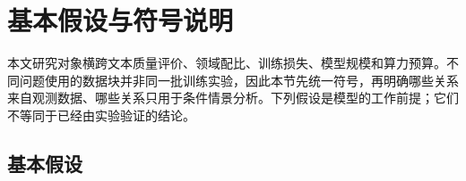 \section{基本假设与符号说明}
\label{sec:assumptions}

本文研究对象横跨文本质量评价、领域配比、训练损失、模型规模和算力预算。不同问题使用的数据块并非同一批训练实验，因此本节先统一符号，再明确哪些关系来自观测数据、哪些关系只用于条件情景分析。下列假设是模型的工作前提；它们不等同于已经由实验验证的结论。

\subsection{基本假设}

